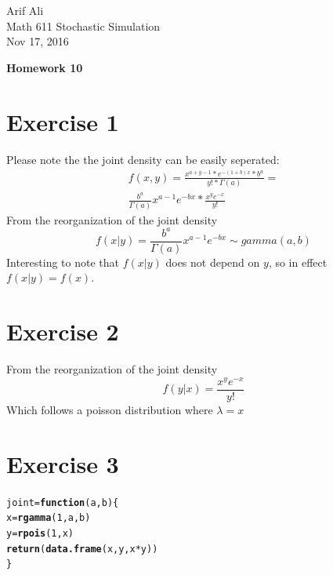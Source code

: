 \documentclass{article}\usepackage[]{graphicx}\usepackage[]{color}
\makeatletter
\newcommand{\hlnum}[1]{\textcolor[rgb]{0.686,0.059,0.569}{#1}}%
\newcommand{\hlopt}[1]{\textcolor[rgb]{0,0,0}{#1}}%
\newcommand{\hlstd}[1]{\textcolor[rgb]{0.345,0.345,0.345}{#1}}%
\newcommand{\hlkwa}[1]{\textcolor[rgb]{0.161,0.373,0.58}{\textbf{#1}}}%
\newcommand{\hlkwb}[1]{\textcolor[rgb]{0.69,0.353,0.396}{#1}}%
\newcommand{\hlkwc}[1]{\textcolor[rgb]{0.333,0.667,0.333}{#1}}%
\newcommand{\hlkwd}[1]{\textcolor[rgb]{0.737,0.353,0.396}{\textbf{#1}}}%
\newenvironment{kframe}{%
 \def\at@end@of@kframe{}%
 \ifinner\ifhmode%
  \def\at@end@of@kframe{\end{minipage}}%
  \begin{minipage}{\columnwidth}%
 \fi\fi%
 \def\FrameCommand##1{\hskip\@totalleftmargin \hskip-\fboxsep
 \colorbox{shadecolor}{##1}\hskip-\fboxsep
     \hskip-\linewidth \hskip-\@totalleftmargin \hskip\columnwidth}%
 \MakeFramed {\advance\hsize-\width
   \@totalleftmargin\z@ \linewidth\hsize
   \@setminipage}}%
 {\par\unskip\endMakeFramed%
 \at@end@of@kframe}
\newenvironment{knitrout}{}{} %
\makeatother
\begin{document}
\begin{flushright}
Arif Ali\\
Math 611 Stochastic Simulation\\
Nov 17, 2016\\
\end{flushright}

\begin{center}
\LARGE\textbf{Homework 10}
  \end{center}
\section*{Exercise 1}
Please note the the joint density can be easily seperated:
\begin{equation}
\begin{split}
f(x,y) = \frac{x^{a+y-1}*e^{-(1+b)x}*b^{a}}{y!*\Gamma(a)} = \\
\frac{b^a}{\Gamma(a)}x^{a-1}e^{-bx}*\frac{x^{y}e^{-x}}{y!}
\end{split}
\end{equation}
From the reorganization of the joint density
\begin{equation}
f(x|y) = \frac{b^a}{\Gamma(a)}x^{a-1}e^{-bx} \sim gamma(a,b)
\end{equation}
Interesting to note that $f(x|y)$ does not depend on $y$, so in effect $f(x|y)=f(x)$.
\section*{Exercise 2}
From the reorganization of the joint density
\begin{equation}
f(y|x) = \frac{x^{y}e^{-x}}{y!}
\end{equation}
Which follows a poisson distribution where $\lambda=x$
\section*{Exercise 3}
\begin{knitrout}
\color{fgcolor}\begin{kframe}
\begin{alltt}
\hlstd{joint} \hlkwb{=} \hlkwa{function}\hlstd{(}\hlkwc{a}\hlstd{,}\hlkwc{b}\hlstd{)\{}
  \hlstd{x} \hlkwb{=} \hlkwd{rgamma}\hlstd{(}\hlnum{1}\hlstd{,a,b)}
  \hlstd{y} \hlkwb{=} \hlkwd{rpois}\hlstd{(}\hlnum{1}\hlstd{,x)}
  \hlkwd{return}\hlstd{(}\hlkwd{data.frame}\hlstd{(x,y,x}\hlopt{*}\hlstd{y))}
\hlstd{\}}
\end{alltt}
\end{kframe}
\end{knitrout}
\end{document}
